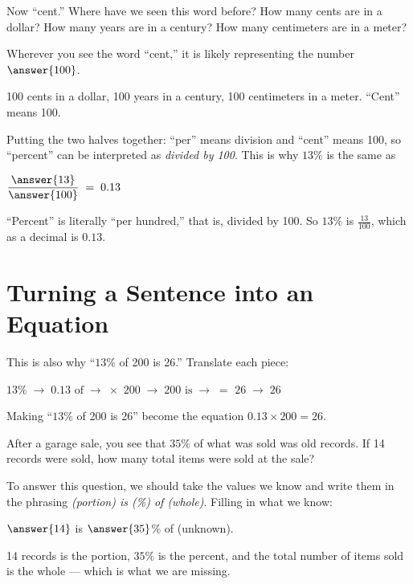 \documentclass[12pt]{ximera}
\begin{document}
\begin{problem}
Now ``cent.'' Where have we seen this word before? How many cents are in a dollar? How
many years are in a century? How many centimeters are in a meter?

Wherever you see the word ``cent,'' it is likely representing the number
$\answer{100}$.

\begin{solution}
100 cents in a dollar, 100 years in a century, 100 centimeters in a meter. ``Cent''
means 100.
\end{solution}
\end{problem}

\begin{problem}
Putting the two halves together: ``per'' means division and ``cent'' means 100, so
``percent'' can be interpreted as \emph{divided by 100}. This is why $13\%$ is the same
as

\begin{center}
$\dfrac{\answer{13}}{\answer{100}} \;=\; 0.13$
\end{center}

\begin{solution}
``Percent'' is literally ``per hundred,'' that is, divided by 100. So $13\%$ is
$\tfrac{13}{100}$, which as a decimal is $0.13$.
\end{solution}
\end{problem}

\section*{Turning a Sentence into an Equation}

This is also why ``$13\%$ of 200 is 26.'' Translate each piece:

\begin{center}
$13\% \;\to\; 0.13$ \qquad $\text{of} \;\to\; \times$ \qquad $200 \;\to\; 200$
\qquad $\text{is} \;\to\; =$ \qquad $26 \;\to\; 26$
\end{center}

Making ``$13\%$ of 200 is 26'' become the equation $0.13 \times 200 = 26$.

\begin{problem}
After a garage sale, you see that $35\%$ of what was sold was old records. If 14
records were sold, how many total items were sold at the sale?

To answer this question, we should take the values we know and write them in the
phrasing \emph{(portion) is (\%) of (whole)}. Filling in what we know:

$\answer{14}$ is $\answer{35}$\% of (unknown).

\begin{solution}
14 records is the portion, $35\%$ is the percent, and the total number of items sold is
the whole --- which is what we are missing.
\end{solution}
\end{problem}
\end{document}
